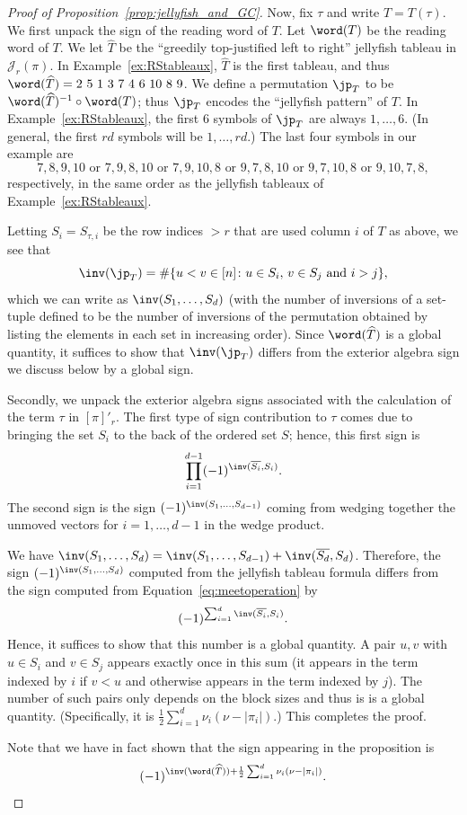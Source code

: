 \begin{proof}[Proof of Proposition~\ref{prop:jellyfish_and_GC}]
Now, fix $\tau$ and write $T = T(\tau)$. We first unpack the sign of the reading word of $T$. Let $\word(T)$ be the reading word of $T$. We let $\widehat{T}$ be the ``greedily top-justified left to right'' jellyfish tableau in $\mathcal{J}_r(\pi)$. In Example~\ref{ex:RStableaux}, $\widehat{T}$ is the first tableau, and thus $\word(\widehat{T}) = 2\ 5\ 1\ 3\ 7\ 4\ 6\ 10\ 8\ 9$. We define a permutation $\jp_T$ to be $\word(\widehat{T})^{-1} \circ \word(T)$; thus $\jp_T$ encodes the ``jellyfish pattern'' of $T$. 
In Example~\ref{ex:RStableaux}, the first $6$ symbols of $\jp_T$ are always $1,\dots,6$. (In general, the first $rd$ symbols will be $1, \dots, rd$.)
The last four symbols in our example are 
\[7,8,9,10 \text{ or } 7,9,8,10 \text{ or } 7,9,10,8 \text{ or } 9,7,8,10 \text{ or } 9,7,10,8 \text{ or } 9,10,7,8,\]
respectively, in the same order as the jellyfish tableaux of Example~\ref{ex:RStableaux}. 


Letting $S_i = S_{\tau, i}$ be the row indices $>r$ that are used column $i$ of $T$ as above, we see that
\begin{equation}
\inv(\jp_T) = \# \{u<v \in [n] \colon u \in S_i, \, v \in S_j \text{ and } i>j \},
\end{equation}
which we can write as $\inv(S_1,\dots,S_d)$ (with the number of inversions of a set-tuple defined to be the number of inversions of the permutation obtained by listing the elements in each set in increasing order). Since $\word(\widehat{T})$ is a global quantity, it suffices to show that $\inv(\jp_T)$ differs from the exterior algebra sign we discuss below by a global sign. 

Secondly, we unpack the exterior algebra signs associated with the calculation of the term $\tau$ in $[\pi]'_r$. The first type of sign contribution to $\tau$ comes due to bringing the set $S_i$ to the back of the ordered set $S$; hence, this  first sign is \[
\prod_{i=1}^{d-1} (-1)^{\inv(\overline{S_i},S_i)}.
\]
The second sign is the sign  $(-1)^{\inv(S_1,\dots,S_{d-1})}$ coming from wedging together the unmoved vectors for $i=1,\dots,d-1$ in the wedge product. 

We have $\inv(S_1,\dots,S_{d}) = \inv(S_1,\dots,S_{d-1})+\inv(\overline{S_d}, S_{d})$. 
Therefore, the sign $(-1)^{\inv(S_1,\dots,S_{d})}$ computed from the jellyfish tableau formula differs from the sign computed from Equation~\eqref{eq:meetoperation} by
\[
(-1)^{\sum_{i=1}^d \inv(\overline{S_i}, S_{i})}.
\]
Hence, it suffices to show that this number is a global quantity. A pair $u,v$ with $u \in S_i$ and $v \in S_j$ appears exactly once in this sum (it appears in the term indexed by $i$ if $v<u$ and otherwise appears in the term indexed by $j$). The number of such pairs only depends on the block sizes and thus is is a global quantity. (Specifically, it is $\frac{1}{2} \sum_{i=1}^d \nu_i(\nu-|\pi_i|)$.) This completes the proof.

Note that we have in fact shown that the sign appearing in the proposition is \[(-1)^{\inv(\word(\widehat{T})) + \frac{1}{2} \sum_{i=1}^d \nu_i(\nu-|\pi_i|) }. \qedhere\]
\end{proof}



